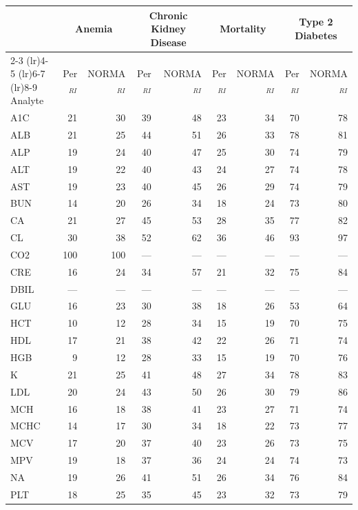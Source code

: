 \begin{table}[ht]
\centering
\footnotesize
\begin{tabular}{lrrrrrrrr}
\toprule
 & \multicolumn{2}{c}{Anemia} & \multicolumn{2}{c}{Chronic Kidney Disease} & \multicolumn{2}{c}{Mortality} & \multicolumn{2}{c}{Type 2 Diabetes} \\
\cmidrule(lr){2-3} \cmidrule(lr){4-5} \cmidrule(lr){6-7} \cmidrule(lr){8-9}
Analyte & Per$_{RI}$ & NORMA$_{RI}$ & Per$_{RI}$ & NORMA$_{RI}$ & Per$_{RI}$ & NORMA$_{RI}$ & Per$_{RI}$ & NORMA$_{RI}$ \\
\midrule
A1C & 21 & 30 & 39 & 48 & 23 & 34 & 70 & 78 \\
ALB & 21 & 25 & 44 & 51 & 26 & 33 & 78 & 81 \\
ALP & 19 & 24 & 40 & 47 & 25 & 30 & 74 & 79 \\
ALT & 19 & 22 & 40 & 43 & 24 & 27 & 74 & 78 \\
AST & 19 & 23 & 40 & 45 & 26 & 29 & 74 & 79 \\
BUN & 14 & 20 & 26 & 34 & 18 & 24 & 73 & 80 \\
CA & 21 & 27 & 45 & 53 & 28 & 35 & 77 & 82 \\
CL & 30 & 38 & 52 & 62 & 36 & 46 & 93 & 97 \\
CO2 & 100 & 100 & --- & --- & --- & --- & --- & --- \\
CRE & 16 & 24 & 34 & 57 & 21 & 32 & 75 & 84 \\
DBIL & --- & --- & --- & --- & --- & --- & --- & --- \\
GLU & 16 & 23 & 30 & 38 & 18 & 26 & 53 & 64 \\
HCT & 10 & 12 & 28 & 34 & 15 & 19 & 70 & 75 \\
HDL & 17 & 21 & 38 & 42 & 22 & 26 & 71 & 74 \\
HGB & 9 & 12 & 28 & 33 & 15 & 19 & 70 & 76 \\
K & 21 & 25 & 41 & 48 & 27 & 34 & 78 & 83 \\
LDL & 20 & 24 & 43 & 50 & 26 & 30 & 79 & 86 \\
MCH & 16 & 18 & 38 & 41 & 23 & 27 & 71 & 74 \\
MCHC & 14 & 17 & 30 & 34 & 18 & 22 & 73 & 77 \\
MCV & 17 & 20 & 37 & 40 & 23 & 26 & 73 & 75 \\
MPV & 19 & 18 & 37 & 36 & 24 & 24 & 74 & 73 \\
NA & 19 & 26 & 41 & 51 & 26 & 34 & 76 & 84 \\
PLT & 18 & 25 & 35 & 45 & 23 & 32 & 73 & 79 \\

\end{tabular}
\end{table}
